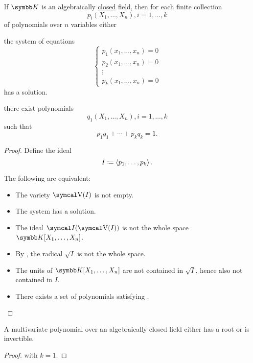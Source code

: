 \begin{corollary}\label{thm:weak_nullstellensatz}
  If \( \BK \) is an algebraically \hyperref[def:algebraically_closed_field]{closed} field, then for each finite collection
  \begin{equation*}
    p_i(X_1, \ldots, X_n), i = 1, \ldots, k
  \end{equation*}
  of polynomials over \( n \) variables either
  \begin{CorEnum}
     the system of equations
    \begin{equation}\label{thm:weak_nullstellensatz/system}
      \begin{cases}
        p_1(x_1, \ldots, x_n) = 0 \\
        p_2(x_1, \ldots, x_n) = 0 \\
        \vdots                    \\
        p_k(x_1, \ldots, x_n) = 0
      \end{cases}
    \end{equation}
    has a solution.

     there exist polynomials
    \begin{equation*}
      q_1(X_1, \ldots, X_n), i = 1, \ldots, k
    \end{equation*}
    such that
    \begin{equation*}
      p_1 q_1 + \cdots + p_k q_k = 1.
    \end{equation*}
  \end{CorEnum}
\end{corollary}
\begin{proof}
  Define the ideal
  \begin{equation*}
    I \coloneqq \Braket{p_1, \ldots, p_k}.
  \end{equation*}

  The following are equivalent:
  \begin{itemize}
    \item The variety \( \CV(I) \) is not empty.
    \item The system  has a solution.
    \item The ideal \( \Cal{I}(\CV(I)) \) is not the whole space \( \BK[X_1, \ldots, X_n] \).
    \item By , the radical \( \sqrt I \) is not the whole space.
    \item The units of \( \BK[X_1, \ldots, X_n] \) are not contained in \( \sqrt I \), hence also not contained in \( I \).
    \item There exists a set of polynomials satisfying .
  \end{itemize}
\end{proof}

\begin{corollary}\label{thm:polynomial_over_closed_field_is_either_invertible_or_has_root}
  A multivariate polynomial over an algebraically closed field either has a root or is invertible.
\end{corollary}
\begin{proof}
   with \( k = 1 \).
\end{proof}
